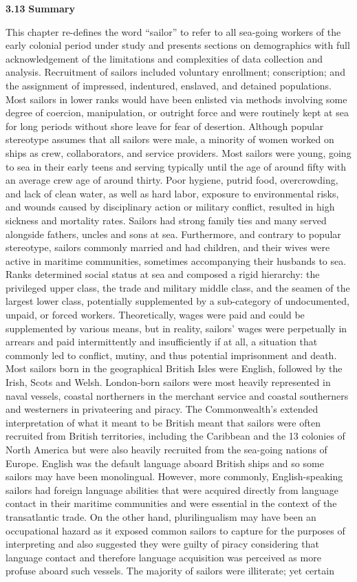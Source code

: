 \textbf{3.13} \textbf{Summary}

  This chapter re-defines the word “sailor” to refer to all sea-going workers of the early colonial period under study and presents sections on demographics with full acknowledgement of the limitations and complexities of data collection and analysis. Recruitment of sailors included voluntary enrollment; conscription; and the assignment of impressed, indentured, enslaved, and detained populations. Most sailors in lower ranks would have been enlisted via methods involving some degree of coercion, manipulation, or outright force and were routinely kept at sea for long periods without shore leave for fear of desertion. Although popular stereotype assumes that all sailors were male, a minority of women worked on ships as crew, collaborators, and service providers. Most sailors were young, going to sea in their early teens and serving typically until the age of around fifty with an average crew age of around thirty. Poor hygiene, putrid food, overcrowding, and lack of clean water, as well as hard labor, exposure to environmental risks, and wounds caused by disciplinary action or military conflict, resulted in high sickness and mortality rates. Sailors had strong family ties and many served alongside fathers, uncles and sons at sea. Furthermore, and contrary to popular stereotype, sailors commonly married and had children, and their wives were active in maritime communities, sometimes accompanying their husbands to sea. Ranks determined social status at sea and composed a rigid hierarchy: the privileged upper class, the trade and military middle class, and the seamen of the largest lower class, potentially supplemented by a sub-category of undocumented, unpaid, or forced workers. Theoretically, wages were paid and could be supplemented by various means, but in reality, sailors’ wages were perpetually in arrears and paid intermittently and insufficiently if at all, a situation that commonly led to conflict, mutiny, and thus potential imprisonment and death. Most sailors born in the geographical British Isles were English, followed by the Irish, Scots and Welsh.  London{}-born sailors were most heavily represented in naval vessels, coastal northerners in the merchant service and coastal southerners and westerners in privateering and piracy. The Commonwealth’s extended interpretation of what it meant to be British meant that sailors were often recruited from British territories, including the Caribbean and the 13 colonies of North America but were also heavily recruited from the sea-going nations of Europe. English was the default language aboard British ships and so some sailors may have been monolingual. However, more commonly, English-speaking sailors had foreign language abilities that were acquired directly from language contact in their maritime communities and were essential in the context of the transatlantic trade. On the other hand, plurilingualism may have been an occupational hazard as it exposed common sailors to capture for the purposes of interpreting and also suggested they were guilty of piracy considering that language contact and therefore language acquisition was perceived as more profuse aboard such vessels. The majority of sailors were illiterate; yet certain 